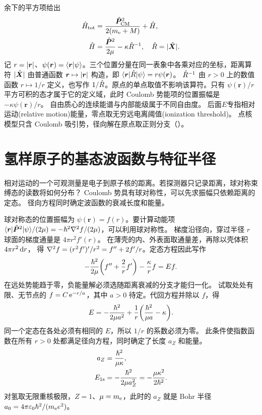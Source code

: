 余下的平方项给出
\begin{subequations}
    \begin{align}
        \hat{H}_{\mathrm{tot}} &= \frac{\hat{\bm{P}}_{\mathrm{CM}}^2}{2(m_{\mathrm{e}} + M)} + \hat{H},\\
        \hat{H} &= \frac{\hat{\bm{P}}^2}{2\mu} - \kappa\hat{R}^{-1},
        \quad \hat{R} = \lvert\hat{\bm{X}}\rvert.
    \end{align}
\end{subequations}
记 $r = \lvert\bm r\rvert$、$\psi(\bm r) = \langle\bm r\vert\psi\rangle$。三个位置分量在同一表象中各乘对应的坐标，距离算符 $\lvert\hat{\bm{X}}\rvert$ 由普通函数 $\bm r \mapsto \lvert\bm r\rvert$ 构造，即 $\langle\bm r\vert\hat{R}\vert\psi\rangle = r\psi(\bm r)$。
$\hat{R}^{-1}$ 由 $r > 0$ 上的数值函数 $r \mapsto 1/r$ 定义，也写作 $1/\hat{R}$。原点的单点取值不影响该算符。只有 $\psi(\bm r)/r$ 平方可积的态才属于它的定义域，此时 Coulomb 势能项的位置振幅是 $-\kappa\psi(\bm r)/r$。
自由质心的连续能谱与内部能级属于不同自由度。
后面$E$专指相对运动(relative motion)能量，零点取无穷远电离阈值(ionization threshold)。
点核模型只含 Coulomb 吸引势，径向解在原点取正则分支（）。

\section{氢样原子的基态波函数与特征半径}
\label{sec:hydrogen-1s}
相对运动的一个可观测量是电子到原子核的距离。若探测器只记录距离，球对称束缚态的读数将如何分布？
Coulomb 势具有球对称性，可以先求振幅只依赖距离的定态。
径向方程同时确定波函数的衰减长度和能量。

球对称态的位置振幅为 $\psi(\bm r) = f(r)$。要计算动能项 $\langle\bm r\vert\hat{\bm{P}}^2\vert\psi\rangle/(2\mu) = -\hbar^2\nabla^2 f/(2\mu)$，可以利用球对称性。
梯度沿径向，穿过半径 $r$ 球面的梯度通量是 $4\pi r^2 f'(r)$。
在薄壳的内、外表面取通量差，再除以壳体积 $4\pi r^2\mathop{}\!\mathrm{d} r$，
得 $\nabla^2 f = (r^2 f')'/r^2 = f'' + 2f'/r$。定态方程因此写作
\begin{equation}
    -\frac{\hbar^2}{2\mu}\biggl(f'' + \frac{2}{r}f'\biggr) - \frac{\kappa}{r}f = Ef.
\end{equation}
在远处势能趋于零，负能量解必须选随距离衰减的分支才能归一化。
试取处处有限、无节点的 $f = C\mathop{}\!\mathrm{e}^{-r/a}$，其中 $a > 0$ 待定。代回方程并除以 $f$，得
\[
    E = -\frac{\hbar^2}{2\mu a^2} +
        \frac{1}{r}\biggl(\frac{\hbar^2}{\mu a} - \kappa\biggr).
\]
同一个定态在各处必须有相同的 $E$，所以 $1/r$ 的系数必须为零。
此条件使指数函数在所有 $r > 0$ 处都满足径向方程，同时确定了长度 $a_Z$ 和能量。
\begin{subequations}\label{eq:hydrogen-1s-scale}
    \begin{align}
        a_Z &= \frac{\hbar^2}{\mu\kappa},\\
        E_{1\mathrm{s}} &= -\frac{\hbar^2}{2\mu a_Z^2} = -\frac{\mu\kappa^2}{2\hbar^2}.
    \end{align}
\end{subequations}
对氢取无限重核极限，$Z = 1$、$\mu = m_{\mathrm{e}}$，此时的 $a_Z$ 就是 Bohr 半径 $a_0 = 4\pi\varepsilon_0\hbar^2/(m_{\mathrm{e}} e^2)$。

